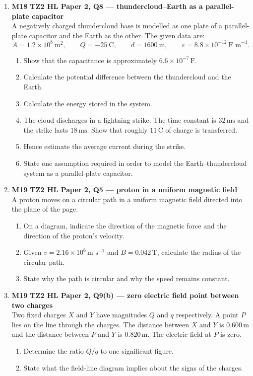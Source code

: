 \documentclass[11pt]{article}
\begin{document}
\begin{enumerate}[leftmargin=*, itemsep=1.2em]
\item \textbf{M18 TZ2 HL Paper 2, Q8 --- thundercloud--Earth as a parallel-plate capacitor}\\
A negatively charged thundercloud base is modelled as one plate of a parallel-plate capacitor and the Earth as the other. The given data are:
\[
A=1.2\times 10^{8}\ \text{m}^2,\qquad Q=-25\ \text{C},\qquad d=1600\ \text{m},\qquad \varepsilon=8.8\times 10^{-12}\ \text{F m}^{-1}.
\]
\begin{enumerate}[label=(\alph*)]
\item Show that the capacitance is approximately $6.6\times 10^{-7}\,\text{F}$.
\item Calculate the potential difference between the thundercloud and the Earth.
\item Calculate the energy stored in the system.
\item The cloud discharges in a lightning strike. The time constant is $32\,\text{ms}$ and the strike lasts $18\,\text{ms}$. Show that roughly $11\,\text{C}$ of charge is transferred.
\item Hence estimate the average current during the strike.
\item State one assumption required in order to model the Earth--thundercloud system as a parallel-plate capacitor.
\end{enumerate}

\item \textbf{M19 TZ2 HL Paper 2, Q5 --- proton in a uniform magnetic field}\\
A proton moves on a circular path in a uniform magnetic field directed into the plane of the page.
\begin{enumerate}[label=(\alph*)]
\item On a diagram, indicate the direction of the magnetic force and the direction of the proton's velocity.
\item Given $v=2.16\times 10^6\,\text{m s}^{-1}$ and $B=0.042\,\text{T}$, calculate the radius of the circular path.
\item State why the path is circular and why the speed remains constant.
\end{enumerate}

\item \textbf{M19 TZ2 HL Paper 2, Q9(b) --- zero electric field point between two charges}\\
Two fixed charges $X$ and $Y$ have magnitudes $Q$ and $q$ respectively. A point $P$ lies on the line through the charges. The distance between $X$ and $Y$ is $0.600\,\text{m}$ and the distance between $P$ and $Y$ is $0.820\,\text{m}$. The electric field at $P$ is zero.
\begin{enumerate}[label=(\alph*)]
\item Determine the ratio $Q/q$ to one significant figure.
\item State what the field-line diagram implies about the signs of the charges.
\end{enumerate}


\end{enumerate}
\end{document}
